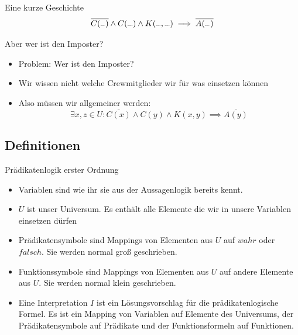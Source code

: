 \begin{frame}[fragile]{Eine kurze Geschichte}
$$
\overline{C(\sus{red})}\wedge C(\sus{white})\wedge K(\sus{red},\sus{white})\implies \overline{A(\sus{white})}
$$
\end{frame}

\begin{frame}[fragile]{Aber wer ist den Imposter?}
\begin{itemize}
    \item<1-> \alert{Problem:} Wer ist den Imposter?
    \item<2-> Wir wissen nicht welche Crewmitglieder wir für was einsetzen können 
    \item<3-> Also müssen wir allgemeiner werden:
    $$
    \exists x,z \in U: \overline{C(x)}\wedge C(y)\wedge K(x,y)\implies \overline{A(y)}
    $$
\end{itemize}
\begin{center}
\end{center}
\end{frame}

\subsection{Definitionen}

\begin{frame}{Prädikatenlogik erster Ordnung}
\begin{itemize}
    \item<1-> \alert{Variablen} sind wie ihr sie aus der Aussagenlogik bereits kennt.
    \item<2-> $U$ ist unser \alert{Universum}. Es enthält alle Elemente die wir in unsere Variablen einsetzen dürfen 
    \item<3-> \alert{Prädikatensymbole} sind Mappings von Elementen aus $U$ auf $wahr$ oder $falsch$.
    Sie werden normal groß geschrieben.
    \item<4-> \alert{Funktionssymbole} sind Mappings von Elementen aus $U$ auf andere Elemente aus $U$.
    Sie werden normal klein geschrieben.
    \item<5> Eine \alert{Interpretation} $I$ ist ein Lösungsvorschlag für die prädikatenlogische Formel.
    Es ist ein Mapping von Variablen auf Elemente des Universums, der Prädikatensymbole auf Prädikate und der Funktionsformeln auf Funktionen.
\end{itemize}
\end{frame}

